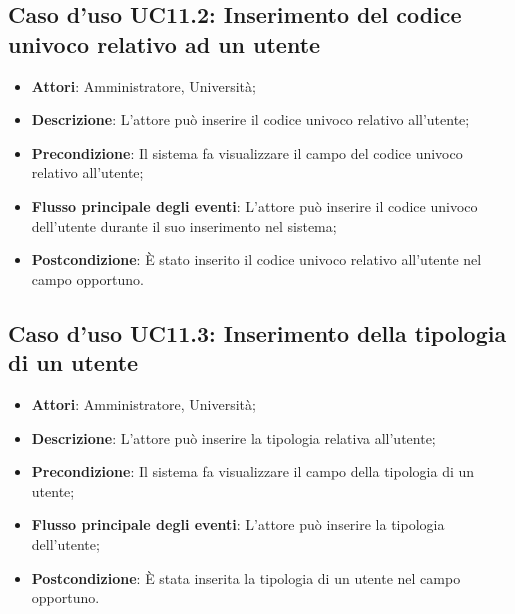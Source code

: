\subsection{Caso d'uso \texorpdfstring{UC11.2}{UC11.2}: Inserimento del codice univoco relativo ad un utente}
\begin{itemize}
\item \textbf{Attori}: Amministratore, Università;
\item \textbf{Descrizione}: L'attore può inserire il codice univoco relativo all'utente;
\item \textbf{Precondizione}: Il sistema fa visualizzare il campo del codice univoco relativo all'utente;

\item \textbf{Flusso principale degli eventi}: L'attore può inserire il codice univoco dell'utente durante il suo inserimento nel sistema;
\item \textbf{Postcondizione}: È stato inserito il codice univoco relativo all'utente nel campo opportuno.

\end{itemize}
\subsection{Caso d'uso \texorpdfstring{UC11.3}{UC11.3}: Inserimento della tipologia di un utente }
\begin{itemize}
\item \textbf{Attori}: Amministratore, Università;
\item \textbf{Descrizione}: L'attore può inserire la tipologia relativa all'utente;
\item \textbf{Precondizione}: Il sistema fa visualizzare il campo della tipologia di un utente;

\item \textbf{Flusso principale degli eventi}: L'attore può inserire la tipologia dell'utente;
\item \textbf{Postcondizione}: È stata inserita la tipologia di un utente nel campo opportuno.

\end{itemize}

